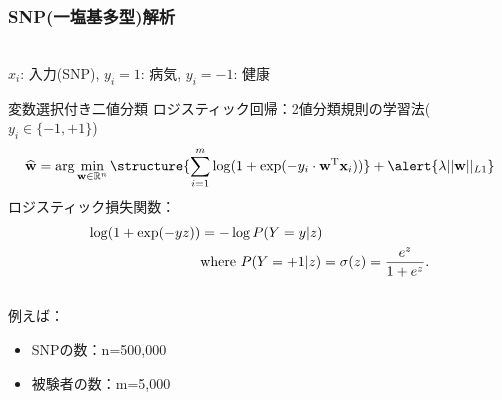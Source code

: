 \documentclass[9pt, dvipdfmx]{beamer}
\begin{document}
\begin{frame}
  \frametitle{SNP(一塩基多型)解析}
  \\
  $x_i$: 入力(SNP), $y_i=1$: 病気, $y_i=-1$: 健康
  \begin{block} {変数選択付き二値分類}
    ロジスティック回帰：2値分類規則の学習法($y_i \in \{-1, +1\}$)
    \begin{equation*}
      \widehat{\bf w} = \arg\min_{{\bf w} \in \mathbb{R}^n} \structure{\sum_{i=1}^m \log(1+\exp(-y_i \cdot {\bf w}^{\rm T} {\bf x}_i))} + \alert{\lambda ||{\bf w}||_{L1}}
      \label{eq: logistic regression}
    \end{equation*}
    ロジスティック損失関数：
    \begin{align*}
      \log(1+\exp(-yz)) &= -\log P(Y=y | z) \\
      &{\rm where}\ P(Y=+1 | z) = \sigma(z) = \frac{e^z}{1+e^z}.
      \label{eq: logistic loss}
    \end{align*}
  \end{block}
  \begin{columns}
    \begin{column}{.5\textwidth}
      例えば：
      \begin{itemize}
        \item SNPの数：n=500,000\\
        \item 被験者の数：m=5,000
      \end{itemize}
    \end{column}
    \begin{column}{.5\textwidth}
    \end{column}
  \end{columns}
\end{frame}


\end{document}
